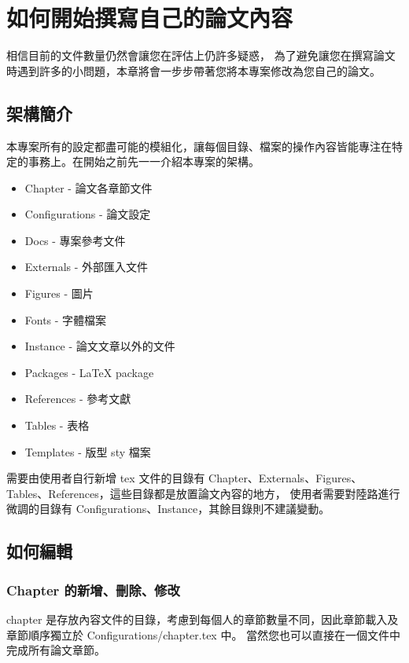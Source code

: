 \chapter{如何開始撰寫自己的論文內容} \label{ch_how2start}

相信目前的文件數量仍然會讓您在評估上仍許多疑惑，
為了避免讓您在撰寫論文時遇到許多的小問題，本章將會一步步帶著您將本專案修改為您自己的論文。

\section{架構簡介}

本專案所有的設定都盡可能的模組化，讓每個目錄、檔案的操作內容皆能專注在特定的事務上。在開始之前先一一介紹本專案的架構。

\begin{itemize}
    \item Chapter - 論文各章節文件
    \item Configurations - 論文設定
    \item Docs - 專案參考文件
    \item Externals - 外部匯入文件
    \item Figures - 圖片
    \item Fonts - 字體檔案
    \item Instance - 論文文章以外的文件
    \item Packages - LaTeX package
    \item References - 參考文獻
    \item Tables - 表格
    \item Templates - 版型 sty 檔案
\end{itemize}

需要由使用者自行新增 tex 文件的目錄有 Chapter、Externals、Figures、Tables、References，這些目錄都是放置論文內容的地方，
使用者需要對陸路進行微調的目錄有 Configurations、Instance，其餘目錄則不建議變動。

\section{如何編輯}

\subsection*{Chapter 的新增、刪除、修改}

chapter 是存放內容文件的目錄，考慮到每個人的章節數量不同，因此章節載入及章節順序獨立於 Configurations/chapter.tex 中。
當然您也可以直接在一個文件中完成所有論文章節。

